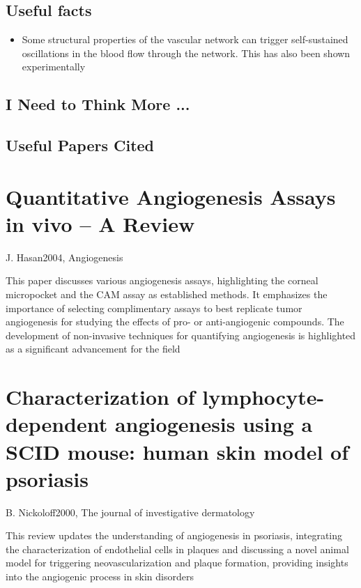 \subsection{Useful facts}
\begin{itemize}[noitemsep]
	\item Some structural properties of the vascular network can trigger self-sustained oscillations in the blood flow through the network. This has also been shown experimentally \cite{Kimura1996-od}
\end{itemize}


\subsection{I Need to Think More ...}


\subsection{Useful Papers Cited}






\section{Quantitative Angiogenesis Assays in vivo – A Review}{J. Hasan}{2004, Angiogenesis}

This paper discusses various angiogenesis assays, highlighting the corneal micropocket and the CAM assay as established methods. It emphasizes the importance of selecting complimentary assays to best replicate tumor angiogenesis for studying the effects of pro- or anti-angiogenic compounds. The development of non-invasive techniques for quantifying angiogenesis is highlighted as a significant advancement for the field \cite{Hasan2004} 


\section{Characterization of lymphocyte-dependent angiogenesis using a SCID mouse: human skin model of psoriasis}{B. Nickoloff}{2000, The journal of investigative dermatology}

This review updates the understanding of angiogenesis in psoriasis, integrating the characterization of endothelial cells in plaques and discussing a novel animal model for triggering neovascularization and plaque formation, providing insights into the angiogenic process in skin disorders \cite{Nickoloff2000}


